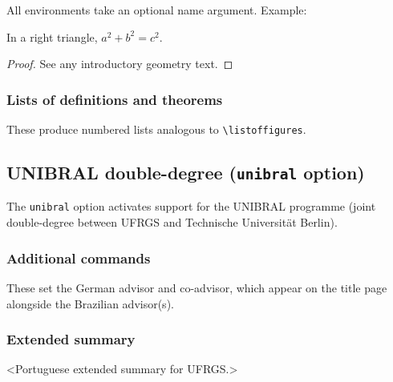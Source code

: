 \documentclass[11pt,a4paper]{article}
\newcommand{\opt}[1]{\texttt{#1}}
\newcommand{\cmd}[1]{\texttt{\textbackslash #1}}
\begin{document}
All environments take an optional name argument.  Example:

\begin{latex}
\begin{theorem}
  In a right triangle, $a^2 + b^2 = c^2$.
\end{theorem}
\begin{proof}
  See any introductory geometry text.
\end{proof}
\end{latex}

\subsubsection{Lists of definitions and theorems}

\begin{latex}
\listofdefinitions
\listoftheorems
\end{latex}

These produce numbered lists analogous to \cmd{listoffigures}.

\subsection{UNIBRAL double-degree (\opt{unibral} option)}
\label{sec:unibral}

The \opt{unibral} option activates support for the UNIBRAL programme
(joint double-degree between UFRGS and Technische Universität Berlin).

\subsubsection{Additional commands}

\begin{latex}
\end{latex}

These set the German advisor and co-advisor, which appear on the title
page alongside the Brazilian advisor(s).

\subsubsection{Extended summary}

\begin{latex}
\extendedsummary
<Portuguese extended summary for UFRGS.>
\end{latex}
\end{document}
